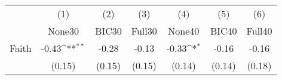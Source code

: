 {
\def\sym#1{\ifmmode^{#1}\else\(^{#1}\)\fi}
\begin{tabular}{l*{6}{c}}
\toprule
            &\multicolumn{1}{c}{(1)}&\multicolumn{1}{c}{(2)}&\multicolumn{1}{c}{(3)}&\multicolumn{1}{c}{(4)}&\multicolumn{1}{c}{(5)}&\multicolumn{1}{c}{(6)}\\
            &\multicolumn{1}{c}{None30}&\multicolumn{1}{c}{BIC30}&\multicolumn{1}{c}{Full30}&\multicolumn{1}{c}{None40}&\multicolumn{1}{c}{BIC40}&\multicolumn{1}{c}{Full40}\\
\midrule
Faith       &       -0.43\sym{**} &       -0.28         &       -0.13         &       -0.33\sym{*}  &       -0.16         &       -0.16         \\
            &      (0.15)         &      (0.15)         &      (0.15)         &      (0.14)         &      (0.14)         &      (0.18)         \\
\bottomrule
\end{tabular}
}
